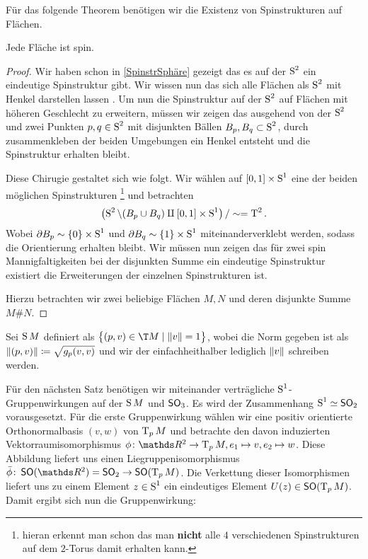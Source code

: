Für das folgende Theorem benötigen wir die Existenz von Spinstrukturen
auf Flächen.
\begin{Satz}\label{existenzspinflächen}
	Jede Fläche ist spin.
	\begin{proof}
		Wir haben schon in \cref{SpinstrSphäre} gezeigt das es 
		auf der $ \S^2 $ ein eindeutige Spinstruktur gibt. Wir
		wissen nun das sich alle Flächen als $ \S^2 $ mit Henkel 
		darstellen lassen . Um nun die Spinstruktur auf der $ \S^2 $
		auf Flächen mit höheren Geschlecht zu erweitern, müssen
		wir zeigen das ausgehend von der $ \S^2 $ und zwei Punkten
		$ p,q \in\S^2 $ mit disjunkten Bällen $ B_p,B_q \subset\S^2$,
		durch zusammenkleben der beiden Umgebungen ein Henkel
		entsteht und die Spinstruktur erhalten bleibt.
		
		Diese Chirugie gestaltet sich wie folgt. Wir wählen auf
		$ [0,1] \times \S^1 $ eine der beiden möglichen Spinstrukturen \footnote{hieran erkennt man schon das man \textbf{nicht} alle $ 4 $ verschiedenen Spinstrukturen auf dem $ 2 $-Torus damit erhalten kann.} und betrachten 
		\begin{gather*}
		 \left( \S^2 \setminus (B_p \cup B_q) \amalg [0,1]\times \S^1 \right) / \sim = \TT^2.
		\end{gather*}
		Wobei $ \partial B_p \sim \{ 0 \}\times \S^1$ und $ \partial B_q \sim \{ 1 \}\times \S^1$ miteinanderverklebt werden, sodass die Orientierung
		erhalten bleibt.
		Wir müssen nun zeigen das für zwei spin Mannigfaltigkeiten bei 
		der disjunkten Summe ein eindeutige Spinstruktur existiert die 
		Erweiterungen der einzelnen Spinstrukturen ist.
	
		Hierzu betrachten wir zwei beliebige Flächen $ M,N $ und deren
		disjunkte Summe $ M \# N $. 	 
	\end{proof}
\end{Satz}

Sei $\S M$ definiert als $\set{(p,v) \in \T M}{ \norm{v} = 1}$, wobei
die Norm gegeben ist als $ \norm{(p,v)} \coloneqq \sqrt{g_p(v,v)} $
und wir der einfachheithalber lediglich $ \norm{v} $ schreiben werden.

Für den nächsten Satz benötigen wir miteinander verträgliche $ \S^1 $-Gruppenwirkungen auf der $ \S M $ und $ \so_3 $. Es wird der
Zusammenhang $ \S^1 \simeq \so_2 $ vorausgesetzt. Für die erste
Gruppenwirkung wählen wir eine positiv orientierte Orthonormalbasis
$ (v,w) $ von $ \tang{p}{M} $ und betrachte den davon induzierten
Vektorraumisomorphismus $ \abb{\phi}{\R^2}{\tang{p}{M}},e_1 \mapsto v, e_2\mapsto w $. Diese
Abbildung liefert uns einen Liegruppenisomorphismus $\abb{\bar{\phi}}{\so(\R^2) = \so_2}{\so(\tang{p}{M})} $. Die Verkettung
dieser Isomorphismen liefert uns zu einem Element $ z\in\S^1 $ ein
eindeutiges Element $ U(z)\in \so(\tang{p}{M}) $. Damit ergibt sich
nun die Gruppenwirkung:

